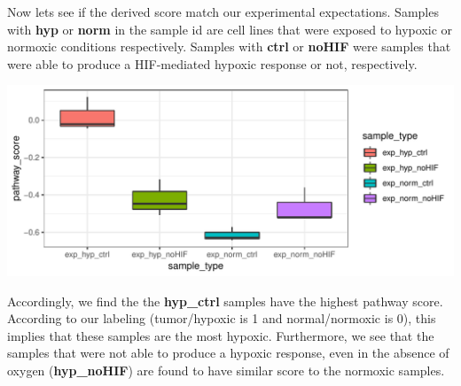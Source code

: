 \documentclass{article}
\begin{document}
Now lets see if the derived score match our experimental expectations.
Samples with \textbf{hyp} or \textbf{norm} in the sample id are cell lines
that were exposed to hypoxic or normoxic conditions respectively.
Samples with \textbf{ctrl} or \textbf{noHIF} were samples that were able to
produce a HIF-mediated hypoxic response or not, respectively.

\begin{Schunk}
\end{Schunk}
\includegraphics{ssPATHS-012}

Accordingly, we find the the \textbf{hyp\_ctrl} samples have the highest pathway
score. According to our labeling (tumor/hypoxic is 1 and normal/normoxic is 0),
this implies that these samples are the most hypoxic. Furthermore, we see that
the samples that were not able to produce a hypoxic response, even in the
absence of oxygen (\textbf{hyp\_noHIF}) are found to have similar score to the
normoxic samples.
\end{document}
